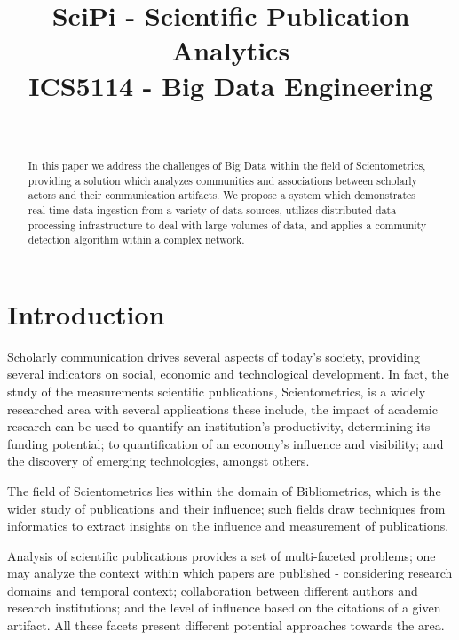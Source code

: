 \documentclass[10pt,journal,final,a4paper]{IEEEtran}
\begin{document}
\title{SciPi - Scientific Publication Analytics\\
{\footnotesize ICS5114 - Big Data Engineering }
}

\author{\\
}

\maketitle

\begin{abstract}
In this paper we address the challenges of Big Data within the field of Scientometrics, providing a solution which analyzes communities and associations between scholarly actors and their communication artifacts. We propose a system which demonstrates real-time data ingestion from a variety of data sources, utilizes distributed data processing infrastructure to deal with large volumes of data, and applies a community detection algorithm within a complex network. 
\end{abstract}

\section{Introduction}
Scholarly communication drives several aspects of today's society, providing several indicators on social\cite{sm_social}, economic\cite{sm_china} and technological development\cite{sm_tech}. In fact, the study of the measurements scientific publications, Scientometrics, is a widely researched area with several applications these include, the impact of academic research can be used to quantify an institution's productivity, determining its funding potential; to quantification of an economy's influence and visibility; and the discovery of emerging technologies, amongst others.

The field of Scientometrics lies within the domain of Bibliometrics, which is the wider study of publications and their influence; such fields draw techniques from informatics to extract insights on the influence and measurement of publications\cite{sm_librametrics}. 

Analysis of scientific publications provides a set of multi-faceted problems; one may analyze the context within which papers are published - considering research domains and temporal context; collaboration between different authors and research institutions\cite{sm_communication}; and the level of influence based on the citations of a given artifact. All these facets present different potential approaches towards the area\cite{sm_overview}\cite{sm_decisionmaking}.
\end{document}
